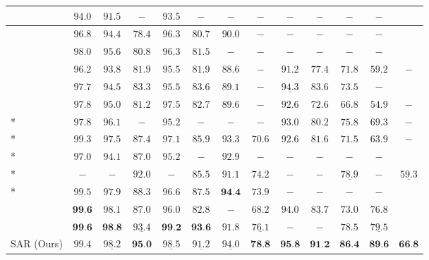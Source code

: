 \documentclass[letterpaper]{article} \usepackage{aaai19}  \usepackage{times}  \usepackage{helvet}  \usepackage{courier}  \usepackage{url}  \usepackage{graphicx}  \usepackage{amsmath}
\begin{document}
\begin{table*}[ht!]
\begin{center}
{\begin{tabular}{l|c|c|c|c|c|c|c|c|c|c|c|c}
				\hline
				\cite{He2015Reading} & $94.0$ & $91.5$ & $-$  & $93.5$  & $-$ & $-$ & $-$ & $-$ & $-$ & $-$ & $-$  \\
				\hline
				\cite{Lee_2016_CVPR} & $96.8$ & $94.4$ & $78.4$  & $96.3$  & $80.7$ & $90.0$ & $-$ & $-$ & $-$ & $-$ & $-$  \\
				\hline
				\cite{OCRNIPS17} & $98.0$ & $95.6$ & $80.8$  & $96.3$  & $81.5$ & $-$ & $-$ & $-$ & $-$ & $-$ & $-$  \\
				\hline
				\cite{shiCVPR2016} & $96.2$ & $93.8$ & $81.9$  & $95.5$  & $81.9$ & $88.6$ & $-$ & $91.2$ & $77.4$ & $71.8$ & $59.2$ & $-$   \\
				\hline
				\cite{BMVC2016_43} & $97.7$ & $94.5$ & $83.3$  & $95.5$  & $83.6$ & $89.1$ & $-$ & $\underline{94.3}$ & $83.6$ & $73.5$ & $-$  \\
				\hline
				\cite{ShiBY15} & $97.8$ & $95.0$ & $81.2$  & $97.5$  & $82.7$ & $89.6$ & $-$ & $92.6$ & $72.6$ & $66.8$ & $54.9$ & $-$   \\
				\hline
				\cite{ijcai2017}* & $97.8$ & $96.1$ & $-$  & $95.2$  & $-$ & $-$ & $-$ & $93.0$ & $80.2$ & $75.8$ & $69.3$ & $-$   \\
				\hline
				\cite{Cheng2017}* & $99.3$ & $97.5$ & $87.4$  & $97.1$  & $85.9$ & $93.3$ & $70.6$ & $92.6$ & $81.6$ & $71.5$ & $63.9$ & $-$   \\
				\hline
				\cite{SqueezeText18}* & $97.0$ & $94.1$ & $87.0$  & $95.2$  & $-$ & $92.9$ & $-$ & $-$ & $-$ & $-$ & $-$  \\
				\hline
				\cite{Liu2018CharNetAC}* & $-$ & $-$ & $92.0$  & $-$  & $85.5$ & $91.1$ & $74.2$ & $-$ & $-$ & $\underline{78.9}$ & $-$ & $\underline{59.3}$  \\
				\hline
				\cite{cheng_EditDistance}* & $\underline{99.5}$ & $97.9$ & $88.3$  & $96.6$  & $87.5$ & $\textbf{94.4}$ & $73.9$ & $-$ & $-$ & $-$ & $-$  \\
				\hline
				\cite{Cheng2018AON} & $\textbf{99.6}$ & $98.1$ & $87.0$  & $96.0$  & $82.8$ & $-$ & $68.2$ & $94.0$ & $\underline{83.7}$ & $73.0$ & $76.8$  \\
				\hline
				\cite{shiPAMI2018} & $\textbf{99.6}$ & $\textbf{98.8}$ & $\underline{93.4}$  & $\textbf{99.2}$  & $\textbf{93.6}$ & $91.8$ & $\underline{76.1}$ & $-$ & $-$ & $78.5$ & $\underline{79.5}$  \\
				\hline
				\hline
				SAR (Ours) & $99.4$ & $\underline{98.2}$ & $\textbf{95.0}$  & $\underline{98.5}$  & $\underline{91.2}$ & $\underline{94.0}$  & $\textbf{78.8}$  & $\textbf{95.8}$ & $\textbf{91.2}$ & $\textbf{86.4}$  & $\textbf{89.6}$ & $\textbf{66.8}$  \\
				\hline
			\end{tabular}
		}
	\end{center}
\end{table*}
\end{document}
